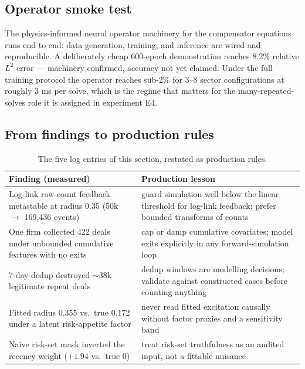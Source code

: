 \subsection{Operator smoke test}
\label{sec:cp-operator}

The physics-informed neural operator machinery for the compensator equations runs end to end: data
generation, training, and inference are wired and reproducible. A deliberately cheap 600-epoch demonstration
reaches 8.2\% relative $L^2$ error --- machinery confirmed, accuracy not yet claimed. Under the full training
protocol the operator reaches sub-2\% for 3--8 sector configurations at roughly 3 ms per solve, which is the
regime that matters for the many-repeated-solves role it is assigned in experiment E4.

\subsection{From findings to production rules}
\label{sec:cp-lessons}

\begin{table}[htbp]
\centering
\footnotesize
\begin{tabular}{p{5.6cm}p{7.6cm}}
\toprule
Finding (measured) & Production lesson \\
\midrule
Log-link raw-count feedback metastable at radius 0.35 (50k $\to$ 169{,}436 events) &
guard simulation well below the linear threshold for log-link feedback; prefer bounded transforms of
counts \\
One firm collected 422 deals under unbounded cumulative features with no exits &
cap or damp cumulative covariates; model exits explicitly in any forward-simulation loop \\
7-day dedup destroyed $\sim$38k legitimate repeat deals &
dedup windows are modelling decisions; validate against constructed cases before counting anything \\
Fitted radius 0.355 vs.\ true 0.172 under a latent risk-appetite factor &
never read fitted excitation causally without factor proxies and a sensitivity band \\
Naive risk-set mask inverted the recency weight ($+1.94$ vs.\ true 0) &
treat risk-set truthfulness as an audited input, not a fittable nuisance \\
\bottomrule
\end{tabular}
\caption{The five log entries of this section, restated as production rules.}
\label{tab:cp-lessons}
\end{table}

